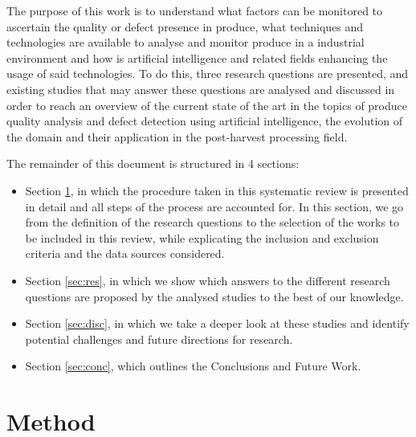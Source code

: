 \documentclass[conference]{IEEEtran}
\begin{document}
The purpose of this work is to understand what factors can be monitored to ascertain the quality or defect presence in produce, what techniques and technologies are available to analyse and monitor produce in a industrial environment and how is artificial intelligence and related fields enhancing the usage of said technologies. To do this, three research questions are presented, and existing studies that may answer these questions are analysed and discussed in order to reach an overview of the current state of the art in the topics of produce quality analysis and defect detection using artificial intelligence, the evolution of the domain and their application in the post-harvest processing field.

The remainder of this document is structured in 4 sections:
\begin{itemize}
	\item Section \ref{sec:meth}, in which the procedure taken in this systematic review is presented in detail and all steps of the process are accounted for. In this section, we go from the definition of the research questions to the selection of the works to be included in this review, while explicating the inclusion and exclusion criteria and the data sources considered.
	\item Section \ref{sec:res}, in which we show which answers to the different research questions are proposed by the analysed studies to the best of our knowledge.
	\item Section \ref{sec:disc}, in which we take a deeper look at these studies and identify potential challenges and future directions for research.
	\item Section \ref{sec:conc}, which outlines the Conclusions and Future Work.
\end{itemize}

\section{Method}
\label{sec:meth}
\end{document}
